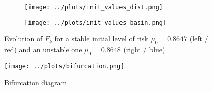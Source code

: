 \documentclass[../../main.tex]{subfiles}
\begin{document}
\begin{figure}[H]
  \begin{subfigure}{\textwidth}
    \centering
    \texttt{[image: ../plots/init\_values\_dist.png]}
  \end{subfigure}
  
  \bigskip
  \centering
  \begin{subfigure}{0.5\textwidth}
    \centering
    \texttt{[image: ../plots/init\_values\_basin.png]} 
  \end{subfigure}

  \caption{Evolution of $F_k$ for a stable initial level of risk $\mu_0 = 0.8647$ (left / red) and an unstable one $\mu_0 = 0.8648$ (right / blue)}  
  \label{fig:small-init}
\end{figure}


\begin{figure}[H]
  \centering
  \texttt{[image: ../plots/bifurcation.png]}
  \caption{Bifurcation diagram }
  \label{fig:two-dimensional:bifurcation}
\end{figure}
\end{document}
